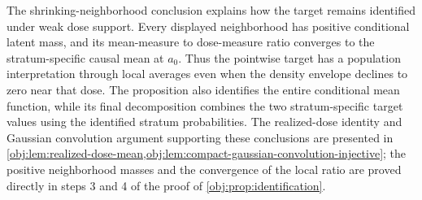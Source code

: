 The shrinking-neighborhood conclusion explains how the target remains identified under weak dose support. Every displayed neighborhood has positive conditional latent mass, and its mean-measure to dose-measure ratio converges to the stratum-specific causal mean at \(a_0\). Thus the pointwise target has a population interpretation through local averages even when the density envelope declines to zero near that dose. The proposition also identifies the entire conditional mean function, while its final decomposition combines the two stratum-specific target values using the identified stratum probabilities. The realized-dose identity and Gaussian convolution argument supporting these conclusions are presented in \cref{obj:lem:realized-dose-mean,obj:lem:compact-gaussian-convolution-injective}; the positive neighborhood masses and the convergence of the local ratio are proved directly in steps 3 and 4 of the proof of \cref{obj:prop:identification}.
